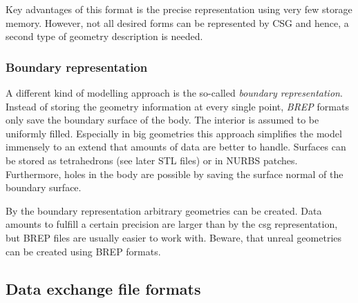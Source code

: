 Key advantages of this format is the precise representation using very few storage memory. However, not all desired forms can be represented by CSG and hence, a second type of geometry description is needed. 
\subsubsection{Boundary representation}
A different kind of modelling approach is the so-called \emph{boundary representation}. Instead of storing the geometry information at every single point, \emph{BREP} formats only save the boundary surface of the body. The interior is assumed to be uniformly filled. Especially in big geometries this approach simplifies the model immensely to an extend that amounts of data are better to handle. Surfaces can be stored as tetrahedrons (see later STL files) or in NURBS patches.
Furthermore, holes in the body are possible by saving the surface normal of the boundary surface. 

By the boundary representation arbitrary geometries can be created. Data amounts to fulfill a certain precision are larger than by the csg representation, but BREP files are usually easier to work with. Beware, that unreal geometries can be created using BREP formats.
\subsection{Data exchange file formats}